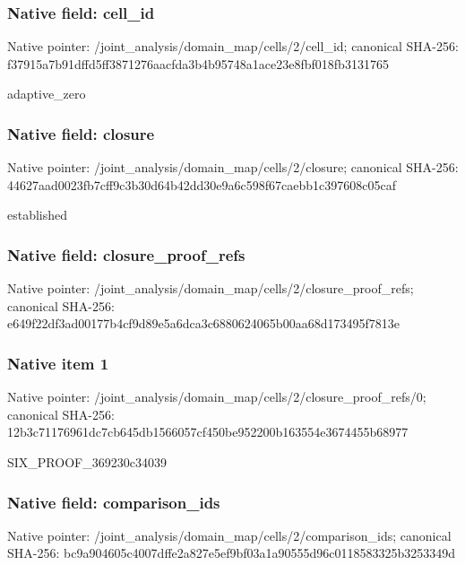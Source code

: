 \documentclass[10pt,a4paper]{article}
\begin{document}
\subsubsection{Native field: cell\_\allowbreak{}id}
Native pointer: /joint\_\allowbreak{}analysis/domain\_\allowbreak{}map/cells/2/cell\_\allowbreak{}id; canonical SHA-256: f37915a7b91dffd5ff3871276aacfda3b4b95748a1ace23e8fbf018fb3131765

\begingroup\raggedright\sloppy adaptive\_\allowbreak{}zero\par\endgroup

\subsubsection{Native field: closure}
Native pointer: /joint\_\allowbreak{}analysis/domain\_\allowbreak{}map/cells/2/closure; canonical SHA-256: 44627aad0023fb7cff9c3b30d64b42dd30e9a6c598f67caebb1c397608c05caf

\begingroup\raggedright\sloppy established\par\endgroup

\subsubsection{Native field: closure\_\allowbreak{}proof\_\allowbreak{}refs}
Native pointer: /joint\_\allowbreak{}analysis/domain\_\allowbreak{}map/cells/2/closure\_\allowbreak{}proof\_\allowbreak{}refs; canonical SHA-256: e649f22df3ad00177b4cf9d89e5a6dca3c6880624065b00aa68d173495f7813e

\subsubsection{Native item 1}
Native pointer: /joint\_\allowbreak{}analysis/domain\_\allowbreak{}map/cells/2/closure\_\allowbreak{}proof\_\allowbreak{}refs/0; canonical SHA-256: 12b3c71176961dc7cb645db1566057cf450be952200b163554e3674455b68977

\begingroup\raggedright\sloppy SIX\_\allowbreak{}PROOF\_\allowbreak{}369230c34039\par\endgroup

\subsubsection{Native field: comparison\_\allowbreak{}ids}
Native pointer: /joint\_\allowbreak{}analysis/domain\_\allowbreak{}map/cells/2/comparison\_\allowbreak{}ids; canonical SHA-256: bc9a904605c4007dffe2a827e5ef9bf03a1a90555d96c0118583325b3253349d
\end{document}
